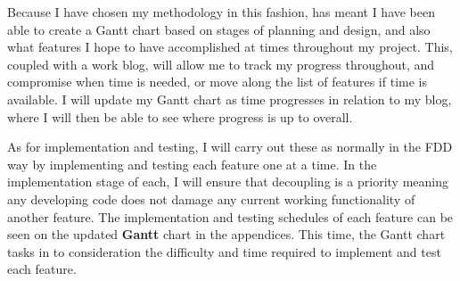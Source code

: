 Because I have chosen my methodology in this fashion, has meant I have been able to create a Gantt chart based on stages of planning and design, and also what features I hope to have accomplished at times throughout my project. This, coupled with a work blog, will allow me to track my progress throughout, and compromise when time is needed, or move along the list of features if time is available. I will update my Gantt chart as time progresses in relation to my blog, where I will then be able to see where progress is up to overall.

As for implementation and testing, I will carry out these as normally in the FDD way by implementing and testing each feature one at a time. In the implementation stage of each, I will ensure that decoupling is a priority meaning any developing code does not damage any current working functionality of another feature. The implementation and testing schedules of each feature can be seen on the updated \textbf{Gantt} chart in the appendices. This time, the Gantt chart tasks in to consideration the difficulty and time required to implement and test each feature.